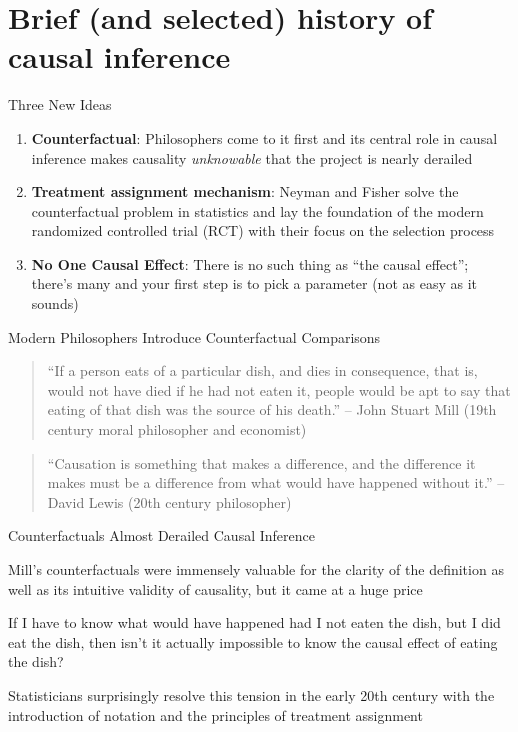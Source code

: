 \documentclass{beamer}
\begin{document}
\section{Brief (and selected) history of causal inference}

\begin{frame}{Three New Ideas}

\begin{enumerate}
\item \textbf{Counterfactual}: Philosophers come to it first and its central role in causal inference makes causality \emph{unknowable} that the project is nearly derailed
\item \textbf{Treatment assignment mechanism}: Neyman and Fisher solve the counterfactual problem in statistics and lay the foundation of the modern randomized controlled trial (RCT) with their focus on the selection process
\item \textbf{No One Causal Effect}: There is no such thing as ``the causal effect''; there's many and your first step is to pick a parameter (not as easy as it sounds)
\end{enumerate}


\end{frame}



\begin{frame}{Modern Philosophers Introduce Counterfactual Comparisons}

\begin{quote}
    ``If a person eats of a particular dish, and dies in consequence, that is, would not have died if he had not eaten it, people would be apt to say that eating of that dish was the source of his death.'' -- John Stuart Mill (19th century moral philosopher and economist)
\end{quote}

\bigskip
  
    \begin{quote}
    ``Causation is something that makes a difference, and the difference it makes must be a difference from what would have happened without it.'' -- David Lewis (20th century philosopher)
\end{quote}

\end{frame}

  
\begin{frame}{Counterfactuals Almost Derailed Causal Inference}



Mill's counterfactuals were immensely valuable for the clarity of the definition as well as its intuitive validity of causality, but it came at a huge price 

\bigskip

If I have to know what would have happened had I not eaten the dish, but I did eat the dish, then isn't it actually impossible to know the causal effect of eating the dish?

\bigskip

Statisticians surprisingly resolve this tension in the early 20th century with the introduction of notation and the principles of treatment assignment


\end{frame}
\end{document}
